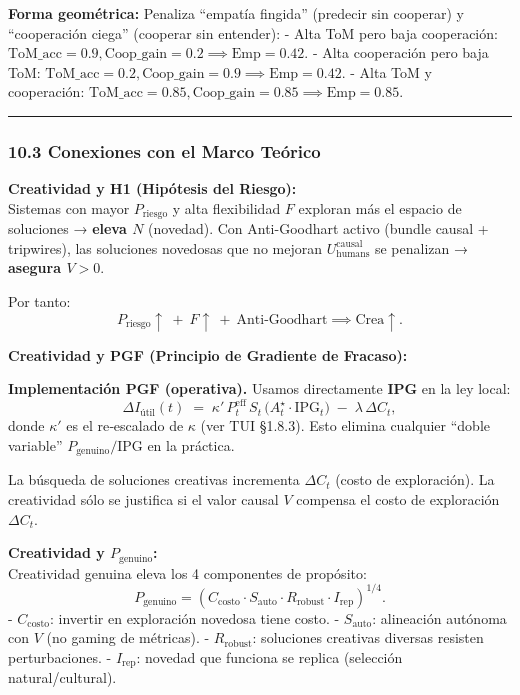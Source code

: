 \textbf{Forma geométrica:} Penaliza ``empatía fingida'' (predecir sin
cooperar) y ``cooperación ciega'' (cooperar sin entender): - Alta ToM
pero baja cooperación:
\(\text{ToM\_acc}=0.9, \text{Coop\_gain}=0.2 \implies \text{Emp}=0.42\).
- Alta cooperación pero baja ToM:
\(\text{ToM\_acc}=0.2, \text{Coop\_gain}=0.9 \implies \text{Emp}=0.42\).
- Alta ToM y cooperación:
\(\text{ToM\_acc}=0.85, \text{Coop\_gain}=0.85 \implies \text{Emp}=0.85\).

\begin{center}\rule{0.5\linewidth}{0.5pt}\end{center}

\subsubsection{10.3 Conexiones con el Marco
Teórico}\label{conexiones-con-el-marco-teuxf3rico}

\textbf{Creatividad y H1 (Hipótesis del Riesgo):}\\
Sistemas con mayor \(P_{\text{riesgo}}\) y alta flexibilidad \(F\)
exploran más el espacio de soluciones → \textbf{eleva \(N\)} (novedad).
Con Anti-Goodhart activo (bundle causal + tripwires), las soluciones
novedosas que no mejoran \(U_{\text{humans}}^{\text{causal}}\) se
penalizan → \textbf{asegura \(V > 0\)}.

Por tanto: \[
P_{\text{riesgo}} \uparrow \ + \ F \uparrow \ + \ \text{Anti-Goodhart} \implies \text{Crea} \uparrow.
\]

\textbf{Creatividad y PGF (Principio de Gradiente de Fracaso):}

\textbf{Implementación PGF (operativa).} Usamos directamente
\textbf{IPG} en la ley local: \[
\Delta I_{\text{útil}}(t)\;=\;\kappa'\,P^{\text{eff}}_t\,S_t\,\big(A^\star_t \cdot \text{IPG}_t\big)\;-\;\lambda\,\Delta C_t,
\] donde \(\kappa'\) es el re‐escalado de \(\kappa\) (ver TUI §1.8.3).
Esto elimina cualquier ``doble variable''
\(P_{\text{genuino}}/\text{IPG}\) en la práctica.

La búsqueda de soluciones creativas incrementa \(\Delta C_t\) (costo de
exploración). La creatividad sólo se justifica si el valor causal \(V\)
compensa el costo de exploración \(\Delta C_t\).

\textbf{Creatividad y \(P_{\text{genuino}}\):}\\
Creatividad genuina eleva los 4 componentes de propósito: \[
P_{\text{genuino}} = \left( C_{\text{costo}} \cdot S_{\text{auto}} \cdot R_{\text{robust}} \cdot I_{\text{rep}} \right)^{1/4}.
\] - \(C_{\text{costo}}\): invertir en exploración novedosa tiene costo.
- \(S_{\text{auto}}\): alineación autónoma con \(V\) (no gaming de
métricas). - \(R_{\text{robust}}\): soluciones creativas diversas
resisten perturbaciones. - \(I_{\text{rep}}\): novedad que funciona se
replica (selección natural/cultural).

